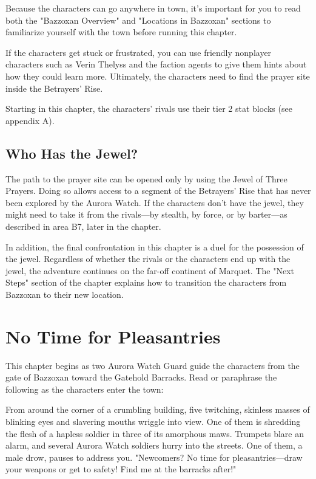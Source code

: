 \documentclass[10pt,a4paper,twoside,bg=print,twocolumn,openany,nodeprecatedcode]{dndbook}
\begin{document}
Because the characters can go anywhere in town, it's important for you to read both the "Bazzoxan Overview" and "Locations in Bazzoxan" sections to familiarize yourself with the town before running this chapter.

If the characters get stuck or frustrated, you can use friendly nonplayer characters such as Verin Thelyss and the faction agents to give them hints about how they could learn more. Ultimately, the characters need to find the prayer site inside the Betrayers' Rise.

Starting in this chapter, the characters' rivals use their tier 2 stat blocks (see appendix A).

\subsection{Who Has the Jewel?}
The path to the prayer site can be opened only by using the Jewel of Three Prayers. Doing so allows access to a segment of the Betrayers' Rise that has never been explored by the Aurora Watch. If the characters don't have the jewel, they might need to take it from the rivals—by stealth, by force, or by barter—as described in area B7, later in the chapter.

In addition, the final confrontation in this chapter is a duel for the possession of the jewel. Regardless of whether the rivals or the characters end up with the jewel, the adventure continues on the far-off continent of Marquet. The "Next Steps" section of the chapter explains how to transition the characters from Bazzoxan to their new location.

\section{No Time for Pleasantries}
This chapter begins as two Aurora Watch Guard guide the characters from the gate of Bazzoxan toward the Gatehold Barracks. Read or paraphrase the following as the characters enter the town:

\begin{DndReadAloud}{}
From around the corner of a crumbling building, five twitching, skinless masses of blinking eyes and slavering mouths wriggle into view. One of them is shredding the flesh of a hapless soldier in three of its amorphous maws. Trumpets blare an alarm, and several Aurora Watch soldiers hurry into the streets. One of them, a male drow, pauses to address you. "Newcomers? No time for pleasantries—draw your weapons or get to safety! Find me at the barracks after!"

\end{DndReadAloud}
\end{document}
